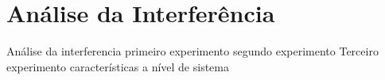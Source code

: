 \chapter{Análise da Interferência}
\label{cap:resultados}
Análise da interferencia
primeiro experimento
segundo experimento
Terceiro experimento
características a nível de sistema
